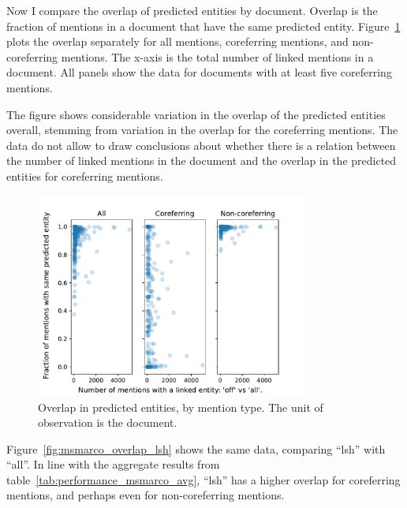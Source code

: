 \documentclass[a4paper,11pt]{article}
\numberwithin{equation}{section} %
\begin{document}
Now I compare the overlap of predicted entities by document. Overlap is the fraction of mentions in a document that have the same predicted entity. 
Figure~\ref{fig:msmarco_overlap_off} plots the overlap separately for all mentions, coreferring mentions, and non-coreferring mentions. The x-axis is the total number of linked mentions in a document.
All panels show the data for documents with at least five coreferring mentions.

The figure shows considerable variation in the overlap of the predicted entities overall, stemming from variation in the overlap for the coreferring mentions. The data do not allow to draw conclusions about whether there is a relation between the number of linked mentions in the document and the overlap in the predicted entities for coreferring mentions.

\begin{figure}[H]
  \centering
  \includegraphics[width = 0.8\textwidth]{../figs/msmarco_overlap_off.pdf}
  \caption{Overlap in predicted entities, by mention type. The unit of observation is the document.}
  \label{fig:msmarco_overlap_off}
\end{figure}


Figure~\ref{fig:msmarco_overlap_lsh} shows the same data, comparing ``lsh'' with ``all''. In line with the aggregate results from table~\ref{tab:performance_msmarco_avg}, ``lsh'' has a higher overlap for coreferring mentions, and perhaps even for non-coreferring mentions.
\end{document}
